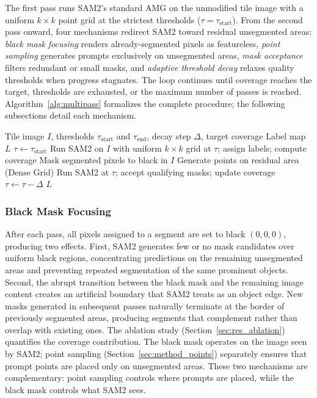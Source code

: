 \documentclass[review,11pt,authoryear]{elsarticle}
\begin{document}
The first pass runs SAM2's standard AMG on the unmodified tile image with a uniform $k \times k$ point grid at the strictest thresholds ($\tau = \tau_{\text{start}}$). From the second pass onward, four mechanisms redirect SAM2 toward residual unsegmented areas: \textit{black mask focusing} renders already-segmented pixels as featureless, \textit{point sampling} generates prompts exclusively on unsegmented areas, \textit{mask acceptance} filters redundant or small masks, and \textit{adaptive threshold decay} relaxes quality thresholds when progress stagnates. The loop continues until coverage reaches the target, thresholds are exhausted, or the maximum number of passes is reached. Algorithm~\ref{alg:multipass} formalizes the complete procedure; the following subsections detail each mechanism.

\begin{algorithm}[h!]
\caption{Multi-pass adaptive segmentation (per tile)}
\label{alg:multipass}
\begin{algorithmic}[1]
\REQUIRE Tile image $I$, thresholds $\tau_{\text{start}}$ and $\tau_{\text{end}}$, decay step $\Delta$, target coverage
\ENSURE Label map $L$
\STATE $\tau \leftarrow \tau_{\text{start}}$
\STATE Run SAM2 on $I$ with uniform $k \times k$ grid at $\tau$; assign labels; compute coverage
\REPEAT
    \STATE Mask segmented pixels to black in $I$
    \STATE Generate points on residual area (Dense Grid)
    \STATE Run SAM2 at $\tau$; accept qualifying masks; update coverage
        \STATE $\tau \leftarrow \tau - \Delta$
    \ENDIF
{}
\RETURN $L$
\end{algorithmic}
\end{algorithm}

\pagebreak
\subsubsection{Black Mask Focusing}
\label{sec:method_blackmask}

After each pass, all pixels assigned to a segment are set to black $(0, 0, 0)$, producing two effects. First, SAM2 generates few or no mask candidates over uniform black regions, concentrating predictions on the remaining unsegmented areas and preventing repeated segmentation of the same prominent objects. Second, the abrupt transition between the black mask and the remaining image content creates an artificial boundary that SAM2 treats as an object edge. New masks generated in subsequent passes naturally terminate at the border of previously segmented areas, producing segments that complement rather than overlap with existing ones. The ablation study (Section~\ref{sec:res_ablation}) quantifies the coverage contribution. The black mask operates on the image seen by SAM2; point sampling (Section~\ref{sec:method_points}) separately ensures that prompt points are placed only on unsegmented areas. These two mechanisms are complementary: point sampling controls where prompts are placed, while the black mask controls what SAM2 sees.
\end{document}
